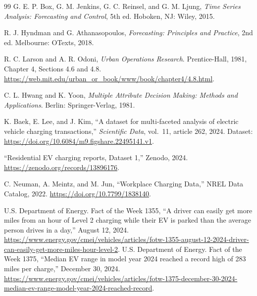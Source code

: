\documentclass[12pt]{article}
\begin{document}
\par\label{lastcontent}
\clearpage
\begin{thebibliography}{99}
G. E. P. Box, G. M. Jenkins, G. C. Reinsel, and G. M. Ljung,
\emph{Time Series Analysis: Forecasting and Control}, 5th ed.
Hoboken, NJ: Wiley, 2015.

R. J. Hyndman and G. Athanasopoulos,
\emph{Forecasting: Principles and Practice}, 2nd ed.
Melbourne: OTexts, 2018.

R. C. Larson and A. R. Odoni, \emph{Urban Operations Research}.
Prentice-Hall, 1981, Chapter 4, Sections 4.6 and 4.8.
\url{https://web.mit.edu/urban_or_book/www/book/chapter4/4.8.html}.

C. L. Hwang and K. Yoon,
\emph{Multiple Attribute Decision Making: Methods and Applications}.
Berlin: Springer-Verlag, 1981.

K. Baek, E. Lee, and J. Kim,
``A dataset for multi-faceted analysis of electric vehicle charging transactions,''
\emph{Scientific Data}, vol.~11, article 262, 2024.
Dataset: \url{https://doi.org/10.6084/m9.figshare.22495141.v1}.

``Residential EV charging reports, Dataset 1,'' Zenodo, 2024.
\url{https://zenodo.org/records/13896176}.

C. Neuman, A. Meintz, and M. Jun,
``Workplace Charging Data,'' NREL Data Catalog, 2022.
\url{https://doi.org/10.7799/1838140}.


 U.S. Department of Energy. Fact of the Week 1355,
``A driver can easily get more miles from an hour of Level 2 charging while their EV
is parked than the average person drives in a day,'' August 12, 2024.
\url{https://www.energy.gov/cmei/vehicles/articles/fotw-1355-august-12-2024-driver-can-easily-get-more-miles-hour-level-2}.
 U.S. Department of Energy. Fact of the Week 1375,
``Median EV range in model year 2024 reached a record high of 283 miles per charge,''
December 30, 2024.
\url{https://www.energy.gov/cmei/vehicles/articles/fotw-1375-december-30-2024-median-ev-range-model-year-2024-reached-record}.
\end{thebibliography}
\end{document}
